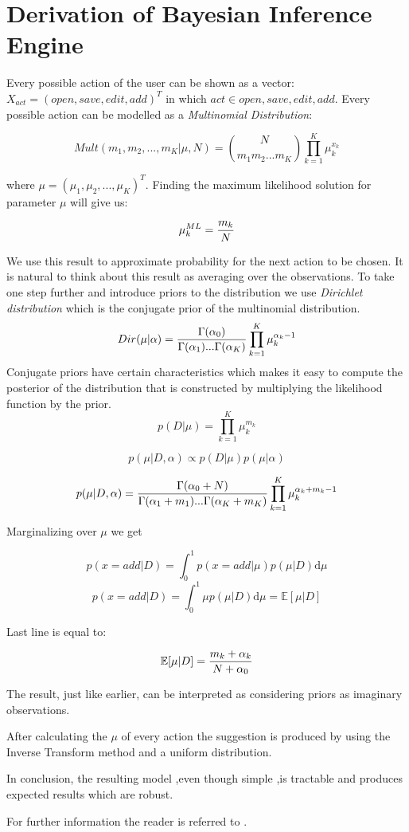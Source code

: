 \section{ Derivation of Bayesian Inference Engine}
Every possible action of the user can be shown as a vector: $X_{act}=(open, save, edit, add)^T$ in which  $act \in {open, save, edit, add}$. Every possible action can be modelled as a \textit{Multinomial Distribution}:

\[
Mult(m_1,m_2,...,m_K|\mu,N)={N \choose m_1 m_2 ... m_K}\prod_{k=1}^K \mu_{k}^{x_k}
\]

where $\mu=(\mu_1,\mu_2,...,\mu_K)^T$. Finding the maximum likelihood solution for parameter $\mu$ will give us:

\[
\mu_k^{ML}={m_k \over N} 
\]

We use this result to approximate probability for the next action to be chosen. It is natural to think about this result as averaging over the observations.
To take one step further and introduce priors to the distribution we use \textit{Dirichlet distribution} which is the conjugate prior of the multinomial distribution.
\[
Dir(\mu|\alpha)={\Gamma(\alpha_0) \over \Gamma(\alpha_1)...\Gamma(\alpha_K)}\prod_{k=1}^K \mu_{k}^{\alpha_k -1}
\]
Conjugate priors have certain characteristics which makes it easy to compute the posterior of the distribution that is constructed by multiplying the likelihood function by the prior.  
\[
p(D|\mu)=\prod_{k=1}^K {\mu_{k}^{m_k}}\]

\[p(\mu| D,\alpha) \propto p(D|\mu)  p(\mu|\alpha)\]

\[p(\mu|D, \alpha)={\Gamma(\alpha_0+N) \over {\Gamma(\alpha_1+m_1)...\Gamma(\alpha_K+m_K)}}\prod_{k=1}^K \mu_{k}^{\alpha_k+m_k-1}\]

Marginalizing over $\mu$ we get 

\[p(x=add|D)=\int_0^1 p(x=add|\mu)p(\mu|D) \mathrm{d}\mu\]
\[p(x=add|D)=\int_0^1 \mu p(\mu|D)\mathrm{d}\mu = \mathbb{E}[\mu|D]\]

Last line is equal to:

\[\mathbb{E}[\mu|D]={m_k+\alpha_k \over {N+\alpha_0}} \]

The result, just like earlier, can be interpreted as considering priors as imaginary observations.

After calculating the $\mu$ of every action the suggestion is produced by using the Inverse Transform\cite{Devroye1986} method and a uniform distribution.

In conclusion, the resulting model ,even though simple ,is tractable and produces expected results which are robust.

For further information the reader is referred to \cite{Bishop2007}. 
